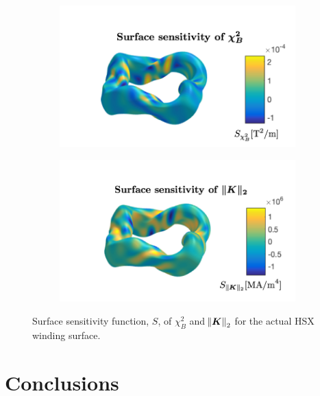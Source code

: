 \documentclass[aps,unsortedaddress]{revtex4-1}
\begin{document}
\begin{figure}
\begin{subfigure}[b]{0.4\textwidth}
\includegraphics[width=1\textwidth]{chi2_B_S_HSX.png}
\end{subfigure}
\begin{subfigure}[b]{0.4\textwidth}
\includegraphics[width=1\textwidth]{rms_K_S_HSX.png}
\end{subfigure}
\caption{ Surface sensitivity function, $S$, of $\chi^2_B$ and $\norm{\bm{K}}_2$ for the actual HSX winding surface. }
\label{hsx_sensitivity}
\end{figure}

\FloatBarrier 

\section{Conclusions}
\label{sect_conclusions}
\end{document}
